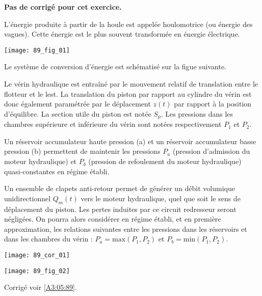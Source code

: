 \normaltrue \difficilefalse \tdifficilefalse
\correctionfalse

\setcounter{numques}{0}
\ifcorrection
\else
\textbf{Pas de corrigé pour cet exercice.}
\fi



\ifprof
\else
L’énergie produite à partir de la houle est appelée houlomotrice (ou énergie des vagues). Cette énergie est le plus souvent
transformée en énergie électrique.

\begin{center}
\texttt{[image: 89\_fig\_01]}
\end{center}

Le système de conversion d'énergie est schématisé sur la figue suivante.

Le vérin hydraulique est entraîné par le mouvement relatif de translation entre le flotteur et le lest.
La translation du piston par rapport au cylindre du vérin est donc également paramétrée par le
déplacement $z(t)$ par rapport à la position d’équilibre. La section utile du piston est notée $S_p$. Les
pressions dans les chambres supérieure et inférieure du vérin sont notées respectivement $P_1$ et $P_2$.

Un réservoir accumulateur haute pression (a) et un réservoir accumulateur basse pression (b)
permettent de maintenir les pressions $P_a$ (pression d'admission du moteur hydraulique) et $P_b$
(pression de refoulement du moteur hydraulique) quasi-constantes en régime établi.

Un ensemble de clapets anti-retour permet de générer un débit volumique unidirectionnel $Q_m(t)$
vers le moteur hydraulique, quel que soit le sens de déplacement du piston. Les pertes induites par
ce circuit redresseur seront négligées. On pourra alors considérer en régime établi, et en première
approximation, les relations suivantes entre les pressions dans les réservoirs et dans les chambres du
vérin : $P_a = \text{max} \left(P_1,P_2\right)$ et $P_b = \text{min} \left(P_1,P_2\right)$.

\fi


\ifprof
\begin{corrige}
\begin{center}
\texttt{[image: 89\_cor\_01]}
\end{center}
\end{corrige}
\else

\begin{center}
\texttt{[image: 89\_fig\_02]}
\end{center}
\fi

\ifprof
\else
\begin{flushright}
\footnotesize{Corrigé  voir \ref{A3:05:89}.}
\end{flushright}%
\fi